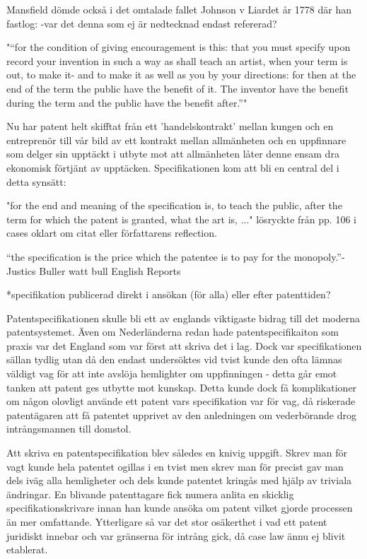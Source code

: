Mansfield dömde också i det omtalade fallet Johnson v Liardet år 1778 där han fastlog:
 -var det denna som ej är nedtecknad endast refererad?

"“for the condition of giving encouragement is this: that 
you must specify upon record your invention in such a 
way as shall teach an artist, when your term is out, to 
make it- and to make it as well as you by your directions: 
for then at the end of the term the public have the benefit 
of it. The inventor have the benefit during the term and 
the public have the benefit after.”" \cite{hulme}

Nu har patent helt skifftat från ett 'handelskontrakt' mellan kungen och en entreprenör till vår bild av ett kontrakt mellan allmänheten och en uppfinnare som delger sin upptäckt i utbyte mot att allmänheten låter denne ensam dra ekonomisk förtjänt av upptäcken. Specifikationen kom att bli en central del i detta synsätt: 

"for the end and meaning of the specification is, to teach the public, after the term for which the patent is granted, what the art is, ..." \cite{cases-davies} lösryckte från pp. 106 i cases oklart om citat eller författarens reflection.


“the specification is the price which 
the patentee is to pay for the monopoly.”-Justics Buller watt bull \cite{2 H. Bl. 463, 472, 126 Eng. Rep. 651, 656 (C.P. 1795)} English Reports

*specifikation publicerad direkt i ansökan (för alla) eller efter patenttiden?

Patentspecifikationen skulle bli ett av englands viktigaste bidrag till det
moderna patentsystemet. Även om
Nederländerna redan hade patentspecifikaiton som praxis var det England som var först att skriva det i
lag. \cite{macleod} Dock var specifikationen sällan tydlig utan då den endast undersöktes vid tvist
kunde den ofta lämnas väldigt vag för att inte avslöja hemlighter om uppfinningen - detta går emot tanken
att patent ges utbytte mot kunskap. Detta kunde dock få komplikationer om någon olovligt använde ett
patent vars specifikation var för vag, då riskerade patentägaren att få patentet upprivet av den anledningen om vederbörande drog intrångsmannen till domstol.

Att skriva en patentspecifikation blev således en knivig uppgift. Skrev man för vagt kunde hela patentet
ogillas i en tvist men skrev man för precist gav man dels iväg alla hemligheter och dels kunde patentet
kringås med hjälp av triviala ändringar\cite{macleod}. En
blivande patenttagare fick numera anlita en skicklig specifikationskrivare innan han kunde ansöka om
patent vilket gjorde processen än mer omfattande\cite{macleod}. Ytterligare så var det stor osäkerthet i vad ett patent juridiskt innebar och var gränserna för intrång gick, då case law ännu ej blivit etablerat.

